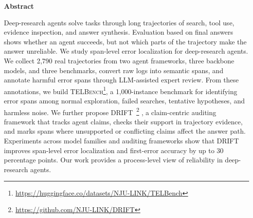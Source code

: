 \begin{abstractbox}
\begin{center}
\textbf{\Large Abstract}
\end{center}
\noindent
    Deep-research agents solve tasks through long trajectories of search, tool use, evidence inspection, and answer synthesis. Evaluation based on final answers shows whether an agent succeeds, but not which parts of the trajectory make the answer unreliable. We study span-level error localization for deep-research agents. We collect 2,790 real trajectories from two agent frameworks, three backbone models, and three benchmarks, convert raw logs into semantic spans, and annotate harmful error spans through LLM-assisted expert review. From these annotations, we build \textsc{TELBench}\footnote{\url{https://huggingface.co/datasets/NJU-LINK/TELBench}}, a 1,000-instance benchmark for identifying error spans among normal exploration, failed searches, tentative hypotheses, and harmless noise. We further propose \textsc{DRIFT}~\footnote{\url{https://github.com/NJU-LINK/DRIFT}} , a claim-centric auditing framework that tracks agent claims, checks their support in trajectory evidence, and marks spans where unsupported or conflicting claims affect the answer path. Experiments across model families and auditing frameworks show that \textsc{DRIFT} improves span-level error localization and first-error accuracy by up to 30 percentage points. Our work provides a process-level view of reliability in deep-research agents.
    
\end{abstractbox}




